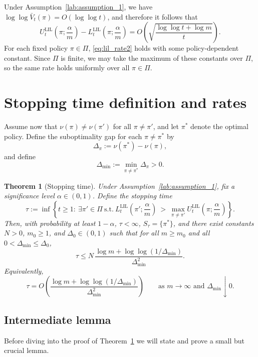 \documentclass[11pt]{article}
\newcommand{\LIL}{\mathrm{LIL}}
\newtheorem{theorem}{Theorem}
\begin{document}
\noindent Under Assumption~\ref{lab:assumption_1}, we have $\log\log \bar V_t(\pi)=O(\log\log t)$, and therefore it follows that
\begin{equation}
U_t^{\LIL}\left(\pi;\frac{\alpha}{m}\right) - L_t^{\LIL}\left(\pi;\frac{\alpha}{m}\right)
= O\!\left(\sqrt{\frac{\log\log t+\log m}{t}}\right).
\label{eq:lil_rate2}
\end{equation}
For each fixed policy $\pi \in \Pi$, \eqref{eq:lil_rate2} holds with some policy-dependent constant. Since $\Pi$ is finite, we may take the maximum of these constants over $\Pi$, so the same rate holds uniformly over all $\pi \in \Pi$.

\section{Stopping time definition and rates}

Assume now that $\nu(\pi) \neq \nu(\pi')$ for all $\pi \ne \pi'$, and let $\pi^*$ denote the optimal policy. Define the suboptimality gap for each $\pi \neq \pi^*$ by
\[
\Delta_\pi := \nu(\pi^*) - \nu(\pi),
\]
and define
\[
\Delta_{\min} := \min_{\pi \neq \pi^*}\Delta_\pi > 0.
\]

\begin{theorem}[Stopping time]
Under Assumption~\ref{lab:assumption_1}, fix a significance level $\alpha \in (0,1)$. Define the stopping time
\[
\tau:=\inf\left\{t\ge1:\ \exists \pi'\in\Pi\ \text{s.t.}\ L_t^{\LIL}\left(\pi';\frac{\alpha}{m}\right)\ >\ \max_{\pi \neq \pi'} U_t^{\LIL}\left(\pi;\frac{\alpha}{m}\right)\right\}.
\]
Then, with probability at least $1-\alpha$, $\tau < \infty$, $S_\tau = \{\pi^*\}$, and there exist constants $N>0$, $m_0 \ge 1$, and $\Delta_0 \in (0,1)$ such that for all $m \ge m_0$ and all $0<\Delta_{\min}\le \Delta_0$,
\[
\tau \le N\,\frac{\log m + \log\log(1/\Delta_{\min})}{\Delta_{\min}^2}.
\]
Equivalently,
\[
\tau = O\!\left(\frac{\log m + \log\log(1/\Delta_{\min})}{\Delta_{\min}^2}\right) \qquad \text{as } m\to\infty \text{ and } \Delta_{\min}\downarrow 0.
\]
\label{thm:stopping_time}
\end{theorem}

\subsection{Intermediate lemma}

Before diving into the proof of Theorem~\ref{thm:stopping_time} we will state and prove a small but crucial lemma.
\end{document}
